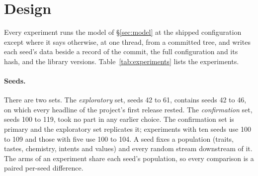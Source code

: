 
\section{Design}
\label{sec:design}

Every experiment runs the model of \S\ref{sec:model} at the shipped configuration
except where it says otherwise, at one thread, from a committed tree, and writes
each seed's data beside a record of the commit, the full configuration and its
hash, and the library versions. Table~\ref{tab:experiments} lists the
experiments.

\begin{table}[t]
\centering

\caption{The experiments, one row per registration, with the commit every seed of
it ran from. Seeds 100--119 are the confirmation set and 42--61 the exploratory set
(\S\ref{sec:design}). Every experiment was registered before it ran except the two
rows marked post hoc; a third post-hoc check, a trend test, needed no new run.
R2-E12, the diagnostics of \S\ref{sec:transient}, reads quantities recorded in
R2-E9's runs and has no row of its own.
Source: \texttt{data/processed/horizon/run\_index.csv}, built from the per-seed
run records.}
\label{tab:experiments}
\end{table}

\paragraph{Seeds.} There are two sets. The \emph{exploratory} set, seeds 42 to 61,
contains seeds 42 to 46, on which every headline of the project's first release
rested. The \emph{confirmation} set, seeds 100 to 119, took no part in any earlier
choice. The
confirmation set is primary and the exploratory set replicates it; experiments
with ten seeds use 100 to 109 and those with five use 100 to 104. A seed fixes a
population (traits, tastes, chemistry, intents and values) and every random
stream downstream of it. The arms of an experiment share each seed's population,
so every comparison is a paired per-seed difference.

